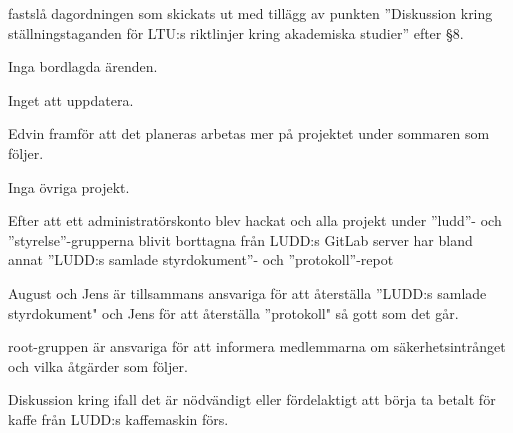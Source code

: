 \documentclass{protokoll}
\date{2019-05-07}  %
\begin{document}
\newpage  


\begin{beslut}
     \att fastslå dagordningen som skickats ut med tillägg av punkten
     ''Diskussion kring ställningstaganden för LTU:s riktlinjer kring
     akademiska studier'' efter \S 8.
\end{beslut}

Inga bordlagda ärenden.

Inget att uppdatera. 

Edvin framför att det planeras arbetas mer på projektet under sommaren som
följer. 

Inga övriga projekt. 

Efter att ett administratörskonto blev hackat och alla projekt under ''ludd''-
och ''styrelse''-grupperna blivit borttagna från LUDD:s GitLab server har bland
annat ''LUDD:s samlade styrdokument''- och ''protokoll''-repot

August och Jens är tillsammans ansvariga för att återställa ''LUDD:s samlade 
styrdokument" och Jens för att återställa ''protokoll" så gott som det går. 

root-gruppen är ansvariga för att informera medlemmarna om säkerhetsintrånget
och vilka åtgärder som följer.

 Diskussion kring ifall det är nödvändigt eller fördelaktigt att börja ta
 betalt för kaffe från LUDD:s kaffemaskin förs. 
\end{document}
